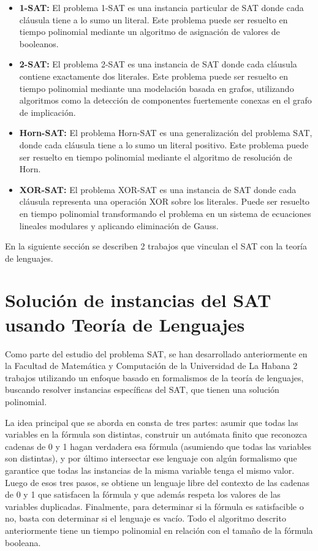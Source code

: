 \begin{itemize}
      \item \textbf{1-SAT:} El problema 1-SAT es una instancia particular de SAT donde cada cláusula tiene a lo sumo un literal.
            Este problema puede ser resuelto en tiempo polinomial mediante un algoritmo de asignación de valores de booleanos.
            
      \item \textbf{2-SAT:} El problema 2-SAT es una instancia de SAT donde cada cláusula contiene exactamente dos literales.
            Este problema puede ser resuelto en tiempo polinomial mediante una modelación basada en grafos, 
            utilizando algoritmos como la detección de componentes fuertemente conexas en el grafo de implicación.
            
      \item \textbf{Horn-SAT:} El problema Horn-SAT es una generalización del problema SAT,
            donde cada cláusula tiene a lo sumo un literal positivo. 
            Este problema puede ser resuelto en tiempo polinomial mediante el algoritmo de resolución de Horn.
            
      \item \textbf{XOR-SAT:} El problema XOR-SAT es una instancia de SAT donde cada cláusula representa una operación XOR
            sobre los literales. Puede ser resuelto en tiempo polinomial transformando el problema en un sistema de ecuaciones 
            lineales modulares y aplicando eliminación de Gauss.
\end{itemize}

En la siguiente sección se describen 2 trabajos que vinculan el SAT con la teoría de lenguajes.

\section{Solución de instancias del SAT usando Teoría de Lenguajes}

Como parte del estudio del problema SAT, se han desarrollado anteriormente en 
la Facultad de Matemática y Computación de la Universidad de La Habana 
2 trabajos utilizando un enfoque 
basado en formalismos de la teoría de lenguajes, buscando resolver 
instancias específicas del SAT, que tienen una solución polinomial. 

La idea principal que se aborda en \cite{aCFSAT} consta de tres partes: asumir que todas las variables en 
la fórmula son distintas, construir un autómata finito que reconozca cadenas de 0 y 1 hagan verdadera esa 
fórmula (asumiendo que todas las variables son distintas), y por último intersectar ese lenguaje con algún 
formalismo que garantice que todas las instancias de la misma variable tenga el mismo valor. Luego de esos 
tres pasos, se obtiene un lenguaje libre del contexto de las cadenas de 0 y 1 que satisfacen la fórmula y 
que además respeta los valores de las variables duplicadas.  Finalmente, para determinar si la fórmula es 
satisfacible o no, basta con determinar si el lenguaje es vacío. Todo el algoritmo descrito anteriormente tiene un tiempo polinomial en relación con el 
tamaño de la fórmula booleana.

